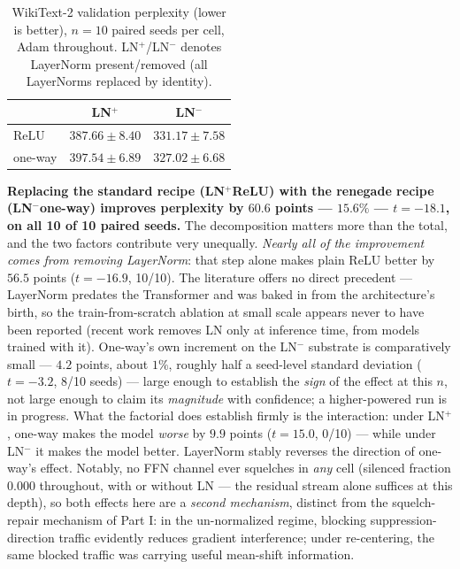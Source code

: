 \documentclass[11pt]{article}
\begin{document}
\begin{table}[H]
\centering
\caption{WikiText-2 validation perplexity (lower is better),
$n{=}10$ paired seeds per cell, Adam throughout. LN$^{+}$/LN$^{-}$
denotes LayerNorm present/removed (all LayerNorms replaced by
identity).}
\label{tab:wikitext}
\begin{tabular}{lcc}
\toprule
 & LN$^{+}$ & LN$^{-}$ \\
\midrule
ReLU     & $387.66 \pm 8.40$ & $331.17 \pm 7.58$ \\
one-way  & $397.54 \pm 6.89$ & $\mathbf{327.02 \pm 6.68}$ \\
\bottomrule
\end{tabular}
\end{table}

\textbf{Replacing the standard recipe (LN$^{+}$ReLU) with the
renegade recipe (LN$^{-}$one-way) improves perplexity by $60.6$
points --- $15.6\%$ --- $t{=}{-}18.1$, on all 10 of 10 paired
seeds.} The decomposition matters more than the total, and the two
factors contribute very unequally. \emph{Nearly all of the
improvement comes from removing LayerNorm}: that step alone makes
plain ReLU better by $56.5$ points ($t{=}{-}16.9$, 10/10). The
literature offers no direct precedent --- LayerNorm predates the
Transformer and was baked in from the architecture's birth, so the
train-from-scratch ablation at small scale appears never to have
been reported (recent work removes LN only at inference time, from
models trained with it). One-way's own increment on the LN$^{-}$
substrate is comparatively small --- $4.2$ points, about $1\%$,
roughly half a seed-level standard deviation ($t{=}{-}3.2$, 8/10
seeds) --- large enough to establish the \emph{sign} of the effect
at this $n$, not large enough to claim its \emph{magnitude} with
confidence; a higher-powered run is in progress. What the factorial
does establish firmly is the interaction: under LN$^{+}$, one-way
makes the model \emph{worse} by $9.9$ points ($t{=}15.0$, 0/10) ---
while under LN$^{-}$ it makes the model better. LayerNorm stably
reverses the direction of one-way's effect. Notably, no FFN channel ever squelches in \emph{any} cell
(silenced fraction $0.000$ throughout, with or without LN --- the
residual stream alone suffices at this depth), so both effects here
are a \emph{second mechanism}, distinct from the squelch-repair
mechanism of Part I: in the un-normalized regime, blocking
suppression-direction traffic evidently reduces gradient
interference; under re-centering, the same blocked traffic was
carrying useful mean-shift information.
\end{document}
